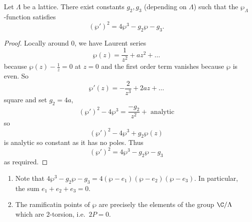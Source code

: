 \documentclass[a4paper]{article}
\begin{document}
\begin{proposition}
  Let \(\Lambda\) be a lattice. There exist constants \(g_2, g_3\) (depending on \(\Lambda\)) such that the \(\wp_\Lambda\)-function satisfies
  \[
    (\wp')^2 = 4 \wp^3 - g_2 \wp - g_3.
  \]
\end{proposition}

\begin{proof}
  Locally around \(0\), we have Laurent series
  \[
    \wp(z) = \frac{1}{z^2} + az^2 + \dots
  \]
  because \(\wp(z) - \frac{1}{z} = 0\) at \(z = 0\) and the first order term vanishes because \(\wp\) is even. So
  \[
    \wp'(z) = - \frac{2}{z^3} + 2az + \dots
  \]
  square and set \(g_2 = 4a\),
  \[
    (\wp')^2 - 4\wp^3 = \frac{-g_2}{z^2} + \text{ analytic}
  \]
  so
  \[
    (\wp')^2 - 4\wp^3 + g_2 \wp(z)
  \]
  is analytic so constant as it has no poles. Thus
  \[
    (\wp')^2 = 4\wp^3 - g_2 \wp - g_3
  \]
  as required.
\end{proof}

\begin{note}\leavevmode
  \begin{enumerate}
  \item Note that \(4\wp^3 - g_2 \wp - g_3 = 4 (\wp - e_1) (\wp - e_2) (\wp - e_3)\). In particular, the sum \(e_1 + e_2 + e_3 = 0\).
  \item The ramificatin points of \(\wp\) are precisely the elements of the group \(\C/\Lambda\) which are \(2\)-torsion, i.e.\ \(2P = 0\).
  \end{enumerate}
\end{note}



\printindex
\end{document}
